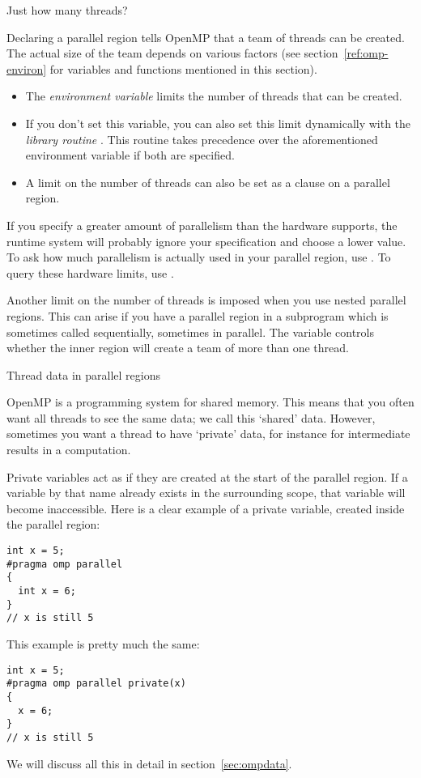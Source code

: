  {Just how many threads?}

Declaring a parallel region tells OpenMP that a team of threads can be created.
The actual size of the team depends on various factors (see section~\ref{ref:omp-environ}
for variables and functions mentioned in this section).
\begin{itemize}
\item The \emph{environment variable}  limits the number of
  threads that can be created.
\item If you don't set this variable, you can also set this limit
  dynamically with the \emph{library routine} . This routine takes
  precedence over the aforementioned environment variable if both are
  specified.
\item A limit on the number of threads can also be set as a clause
  on a parallel region.
\end{itemize}
If you specify a greater amount of parallelism than the hardware supports,
the runtime system will probably ignore your specification and choose a lower value.
To ask how much parallelism is actually used in your parallel region,
use . To query these hardware limits,
use .

Another limit on the number of threads is imposed when you use nested parallel regions.
This can arise if you have a parallel region in a subprogram which is sometimes called
sequentially, sometimes in parallel. The variable  controls
whether the inner region will create a team of more than one thread.

 {Thread data in parallel regions}

OpenMP is a programming system for shared memory. This means that
you often want all threads to see the same data; we call this `shared' data.
However, sometimes you want a thread to have `private' data, for instance
for intermediate results in a computation.

Private variables act as if they are created at the start of the parallel region.
If a variable by that name already exists in the surrounding scope,
that variable will become inaccessible. Here is a clear example of a private variable,
created inside the parallel region:
\begin{verbatim}
int x = 5;
#pragma omp parallel
{ 
  int x = 6;
}
// x is still 5
\end{verbatim}
This example is pretty much the same:
\begin{verbatim}
int x = 5;
#pragma omp parallel private(x)
{ 
  x = 6;
}
// x is still 5
\end{verbatim}
We will discuss all this in detail in section~\ref{sec:ompdata}.

